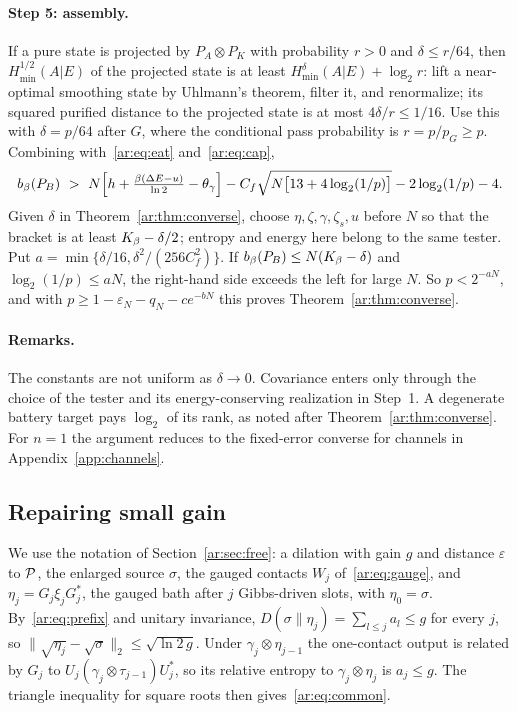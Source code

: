 \paragraph{Step 5: assembly.} If a pure state is projected by $P_A\otimes P_K$ with probability $r>0$ and $\delta\le r/64$, then $H_{\min}^{1/2}(A|E)$ of the projected state is at least $H_{\min}^\delta(A|E)+\log_2r$: lift a near-optimal smoothing state by Uhlmann's theorem, filter it, and renormalize; its squared purified distance to the projected state is at most $4\delta/r\le1/16$. Use this with $\delta=p/64$ after $G$, where the conditional pass probability is $r=p/p_G\ge p$. Combining with~\eqref{ar:eq:eat} and~\eqref{ar:eq:cap},
\[
b_\beta(P_B)\ >\ N\Bigl[h+\tfrac{\beta(\Delta E-u)}{\ln2}-\theta_\gamma\Bigr]-C_f\sqrt{N\bigl[13+4\log_2(1/p)\bigr]}-2\log_2(1/p)-4.
\]
Given $\delta$ in Theorem~\ref{ar:thm:converse}, choose $\eta,\zeta,\gamma,\zeta_s,u$ before $N$ so that the bracket is at least $K_\beta-\delta/2$; entropy and energy here belong to the same tester. Put $a=\min\{\delta/16,\delta^2/(256C_f^2)\}$. If $b_\beta(P_B)\le N(K_\beta-\delta)$ and $\log_2(1/p)\le aN$, the right-hand side exceeds the left for large $N$. So $p<2^{-aN}$, and with $p\ge1-\varepsilon_N-q_N-ce^{-bN}$ this proves Theorem~\ref{ar:thm:converse}.

\paragraph{Remarks.} The constants are not uniform as $\delta\to0$. Covariance enters only through the choice of the tester and its energy-conserving realization in Step~1. A degenerate battery target pays $\log_2$ of its rank, as noted after Theorem~\ref{ar:thm:converse}. For $n=1$ the argument reduces to the fixed-error converse for channels in Appendix~\ref{app:channels}.

\subsection{Repairing small gain}\label{ar:app:free}

We use the notation of Section~\ref{ar:sec:free}: a dilation with gain $g$ and distance $\varepsilon$ to $\mathcal P$, the enlarged source $\sigma$, the gauged contacts $W_j$ of~\eqref{ar:eq:gauge}, and $\eta_j=G_j\xi_jG_j^*$, the gauged bath after $j$ Gibbs-driven slots, with $\eta_0=\sigma$. By~\eqref{ar:eq:prefix} and unitary invariance, $D(\sigma\|\eta_j)=\sum_{l\le j}a_l\le g$ for every $j$, so $\|\sqrt{\eta_j}-\sqrt\sigma\|_2\le\sqrt{\ln2\,g}$. Under $\gamma_j\otimes\eta_{j-1}$ the one-contact output is related by $G_j$ to $U_j(\gamma_j\otimes\tau_{j-1})U_j^*$, so its relative entropy to $\gamma_j\otimes\eta_j$ is $a_j\le g$. The triangle inequality for square roots then gives~\eqref{ar:eq:common}.

